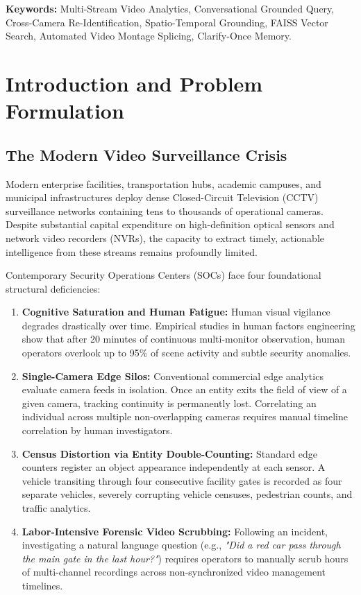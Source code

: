 \documentclass[12pt,a4paper]{article}
\begin{document}
\vspace{0.2cm}
\noindent\textbf{Keywords:} Multi-Stream Video Analytics, Conversational Grounded Query, Cross-Camera Re-Identification, Spatio-Temporal Grounding, FAISS Vector Search, Automated Video Montage Splicing, Clarify-Once Memory.

\vspace{0.4cm}
\noindent\hrulefill

\section{Introduction and Problem Formulation}

\subsection{The Modern Video Surveillance Crisis}
Modern enterprise facilities, transportation hubs, academic campuses, and municipal infrastructures deploy dense Closed-Circuit Television (CCTV) surveillance networks containing tens to thousands of operational cameras. Despite substantial capital expenditure on high-definition optical sensors and network video recorders (NVRs), the capacity to extract timely, actionable intelligence from these streams remains profoundly limited.

Contemporary Security Operations Centers (SOCs) face four foundational structural deficiencies:
\begin{enumerate}
    \item \textbf{Cognitive Saturation and Human Fatigue:} Human visual vigilance degrades drastically over time. Empirical studies in human factors engineering show that after 20 minutes of continuous multi-monitor observation, human operators overlook up to 95\% of scene activity and subtle security anomalies.
    \item \textbf{Single-Camera Edge Silos:} Conventional commercial edge analytics evaluate camera feeds in isolation. Once an entity exits the field of view of a given camera, tracking continuity is permanently lost. Correlating an individual across multiple non-overlapping cameras requires manual timeline correlation by human investigators.
    \item \textbf{Census Distortion via Entity Double-Counting:} Standard edge counters register an object appearance independently at each sensor. A vehicle transiting through four consecutive facility gates is recorded as four separate vehicles, severely corrupting vehicle censuses, pedestrian counts, and traffic analytics.
    \item \textbf{Labor-Intensive Forensic Video Scrubbing:} Following an incident, investigating a natural language question (e.g., \textit{"Did a red car pass through the main gate in the last hour?"}) requires operators to manually scrub hours of multi-channel recordings across non-synchronized video management timelines.
\end{enumerate}
\end{document}
